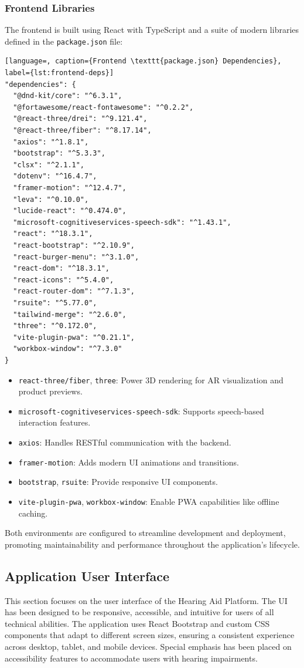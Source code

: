 \documentclass{article}
\begin{document}
\subsubsection{Frontend Libraries}

The frontend is built using React with TypeScript and a suite of modern libraries defined in the \texttt{package.json} file:

\begin{lstlisting}[language=, caption={Frontend \texttt{package.json} Dependencies}, label={lst:frontend-deps}]
"dependencies": {
  "@dnd-kit/core": "^6.3.1",
  "@fortawesome/react-fontawesome": "^0.2.2",
  "@react-three/drei": "^9.121.4",
  "@react-three/fiber": "^8.17.14",
  "axios": "^1.8.1",
  "bootstrap": "^5.3.3",
  "clsx": "^2.1.1",
  "dotenv": "^16.4.7",
  "framer-motion": "^12.4.7",
  "leva": "^0.10.0",
  "lucide-react": "^0.474.0",
  "microsoft-cognitiveservices-speech-sdk": "^1.43.1",
  "react": "^18.3.1",
  "react-bootstrap": "^2.10.9",
  "react-burger-menu": "^3.1.0",
  "react-dom": "^18.3.1",
  "react-icons": "^5.4.0",
  "react-router-dom": "^7.1.3",
  "rsuite": "^5.77.0",
  "tailwind-merge": "^2.6.0",
  "three": "^0.172.0",
  "vite-plugin-pwa": "^0.21.1",
  "workbox-window": "^7.3.0"
}
\end{lstlisting}

\begin{itemize}
    \item \texttt{react-three/fiber}, \texttt{three}: Power 3D rendering for AR visualization and product previews.
    \item \texttt{microsoft-cognitiveservices-speech-sdk}: Supports speech-based interaction features.
    \item \texttt{axios}: Handles RESTful communication with the backend.
    \item \texttt{framer-motion}: Adds modern UI animations and transitions.
    \item \texttt{bootstrap}, \texttt{rsuite}: Provide responsive UI components.
    \item \texttt{vite-plugin-pwa}, \texttt{workbox-window}: Enable PWA capabilities like offline caching.
\end{itemize}

Both environments are configured to streamline development and deployment, promoting maintainability and performance throughout the application's lifecycle.

\subsection{Application User Interface}
This section focuses on the user interface of the Hearing Aid Platform. The UI has been designed to be responsive, accessible, and intuitive for users of all technical abilities. The application uses React Bootstrap and custom CSS components that adapt to different screen sizes, ensuring a consistent experience across desktop, tablet, and mobile devices. Special emphasis has been placed on accessibility features to accommodate users with hearing impairments.
\end{document}

